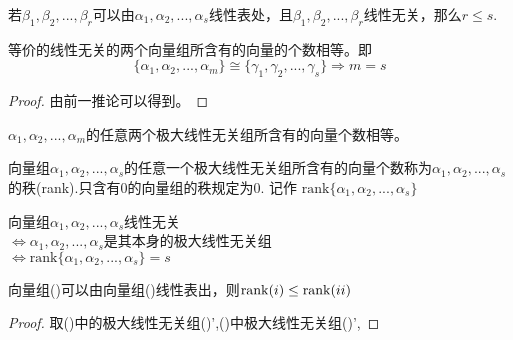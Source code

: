 \documentclass[blue,normal,cn]{elegantnote}
\begin{document}
\begin{theorem}
\begin{lemma} 
    \label{1}
    若$β_1,β_2,...,β_r$可以由$α_1,α_2,...,α_s$线性表处，且$β_1,β_2,...,β_r$线性无关，那么$r≤s$.
\end{lemma}

\begin{corollary}
   等价的线性无关的两个向量组所含有的向量的个数相等。即
   \begin{equation*}
    \{α_1,α_2,...,α_m\} \cong \{γ_1,γ_2,...,γ_s\} \Rightarrow m=s
   \end{equation*}
\end{corollary}

\begin{proof}
    由前一推论可以得到。
\end{proof}


\begin{corollary}
    $α_1,α_2,...,α_m$的任意两个极大线性无关组所含有的向量个数相等。
 \end{corollary}

\begin{definition}
    向量组$α_1,α_2,...,α_s$的任意一个极大线性无关组所含有的向量个数称为$α_1,α_2,...,α_s$的秩(rank).只含有0的向量组的秩规定为0.
    记作 $\mathrm{rank}\{α_1,α_2,...,α_s\}$
\end{definition}

\begin{proposition}
向量组$α_1,α_2,...,α_s$线性无关 \\
$\Leftrightarrow α_1,α_2,...,α_s$是其本身的极大线性无关组\\
$\Leftrightarrow \mathrm{rank}\{α_1,α_2,...,α_s\}=s$
\end{proposition}

\begin{proposition}
    向量组(\uppercase\expandafter{})可以由向量组(\uppercase\expandafter{})线性表出，则$\mathrm{rank}(\uppercase\expandafter{\romannumeral1}) \leq \mathrm{rank}(\uppercase\expandafter{\romannumeral2})$
\end{proposition}

\begin{proof}
    取(\uppercase\expandafter{})中的极大线性无关组(\uppercase\expandafter{})',(\uppercase\expandafter{})中极大线性无关组(\uppercase\expandafter{})',


\end{proof}
\end{theorem}
\end{document}
